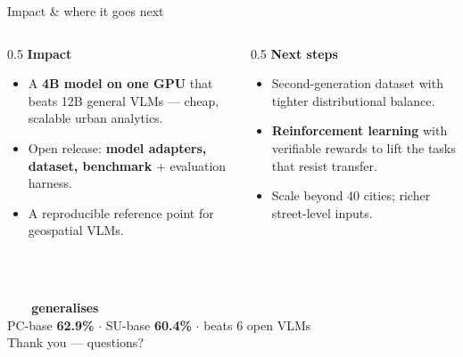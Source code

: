\documentclass[aspectratio=169, 11pt]{beamer}
\newcommand{\blue}[1]{\textcolor{oellmblue}{\textbf{#1}}}
\begin{document}
\begin{frame}{Impact \& where it goes next}
\begin{columns}[T]
\begin{column}{0.5\textwidth}
  \textbf{Impact}
  \begin{itemize}
    \item A \blue{4B model on one GPU} that beats 12B general VLMs --- cheap, scalable urban analytics.
    \item Open release: \blue{model adapters, dataset, benchmark} + evaluation harness.
    \item A reproducible reference point for geospatial VLMs.
  \end{itemize}
\end{column}
\begin{column}{0.5\textwidth}
  \textbf{Next steps}
  \begin{itemize}
    \item Second-generation dataset with tighter distributional balance.
    \item \blue{Reinforcement learning} with verifiable rewards to lift the tasks that resist transfer.
    \item Scale beyond 40 cities; richer street-level inputs.
  \end{itemize}
\end{column}
\end{columns}
\end{frame}

{
\begin{frame}[plain]
  \centering
  \vfill
  {\Huge\textbf{\textcolor{white}{OELLM}}}\\[0.8em]
  {\Large\textcolor{white}{A 4B vision--language model that reads cities ---}}\\[0.3em]
  {\Large\textcolor{white}{and }\textcolor{oellmorange}{\textbf{generalises}}\textcolor{white}{ to ones it has never seen.}}\\[1.4em]
  {\large\textcolor{paperbg}{PC-base \textbf{62.9\%}\;\; $\cdot$\;\; SU-base \textbf{60.4\%}\;\; $\cdot$\;\; beats 6 open VLMs}}\\[2em]
  {\textcolor{paperbg}{Thank you --- questions?}}
  \vfill
\end{frame}
}
\end{document}
